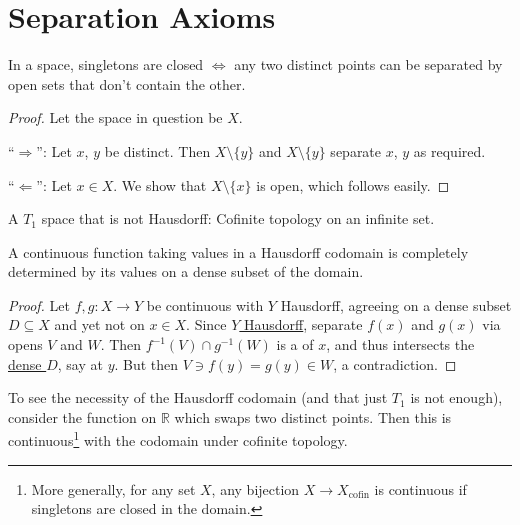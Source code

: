 	

\section{Separation Axioms}

	\begin{lem}[$T_1$ spaces]\label{LEM: t1 spaces}
		In a space, singletons are closed $\iff$ any two distinct points can be separated by open sets that don't contain the other.
	\end{lem}
	
	\begin{proof}
		Let the space in question be $X$.
		
		``$\Rightarrow$'': Let $x$, $y$ be distinct. Then $X\setminus\{y\}$ and $X\setminus\{y\}$ separate $x$, $y$ as required.
		
		``$\Leftarrow$'': Let $x\in X$. We show that $X\setminus\{x\}$ is open, which follows easily.
	\end{proof}
	
	\begin{rmk}
		A $T_1$ space that is not Hausdorff: Cofinite topology on an infinite set.
	\end{rmk}
	

	\begin{prp}\label{PRP: cont func into Hausdorff uniquely by its vals on dense subset}
		A continuous function taking values in a Hausdorff codomain is completely determined by its values on a dense subset of the domain.
	\end{prp}
	
	\begin{proof}
		Let $f, g\colon X\to Y$ be continuous with $Y$ Hausdorff, agreeing on a dense subset $D\subseteq X$ and yet not on $x\in X$. Since \uline{$Y$ Hausdorff}, separate $f(x)$ and $g(x)$ via opens $V$ and $W$. Then $f^{-1}(V)\cap g^{-1}(W)$ is a \nbd of $x$, and thus intersects the \uline{dense $D$}, say at $y$. But then $V\ni f(y) = g(y)\in W$, a contradiction.
	\end{proof}
	
	\begin{rmk}
		To see the necessity of the Hausdorff codomain (and that just $T_1$ is not enough), consider the function on $\mathbb R$ which swaps two distinct points. Then this is continuous\footnote{
			More generally, for any set $X$, any bijection $X\to X_\text{cofin}$ is continuous if singletons are closed in the domain.
		} with the codomain under cofinite topology.
	\end{rmk}


